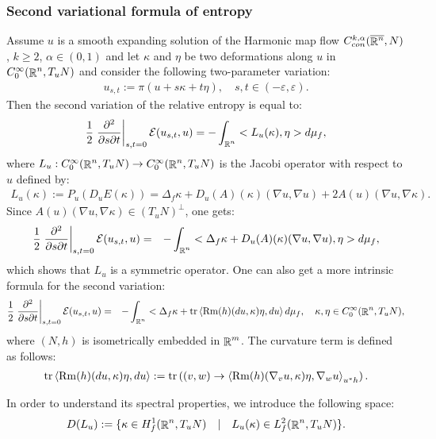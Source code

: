 \documentclass[a4paper,11pt,reqno]{amsart}
\def\Rm{\mathop{\rm Rm}\nolimits}
\def\tr{\mathop{\rm tr}\nolimits}
\def\Rm{\mathop{\rm Rm}\nolimits}
\def\tr{\mathop{\rm tr}\nolimits}
\def\R{\mathop{\rm \mathbb{R}}\nolimits}
\newcommand{\Ent}{\mathcal{E}}
\begin{document}
\subsubsection{Second variational formula of entropy}

Assume $u$ is a smooth expanding solution of the Harmonic map flow $C_{con}^{k,\alpha}(\overline{\R^n},N)$, $k\geq 2$, $\alpha\in(0,1)$ and let $\kappa$ and $\eta$ be two deformations along $u$ in $C^{\infty}_0(\R^n,T_uN)$  and consider the following two-parameter variation:
\begin{eqnarray*}
u_{s,t}:=\pi(u+s\kappa+t\eta),\quad s,t\in(-\varepsilon,\varepsilon).
\end{eqnarray*}
Then the second variation of the relative entropy is equal to:
\begin{eqnarray*}
\frac{1}{2}\left.\frac{\partial^2}{\partial s\partial t}\right|_{s,t=0}\Ent(u_{s,t},u)=-\int_{\R^n}<L_u(\kappa),\eta>d\mu_f,
\end{eqnarray*}
where $L_u:C^{\infty}_0(\R^n,T_uN)\rightarrow C^{\infty}_0(\R^n,T_uN)$ is the Jacobi operator with respect to $u$ defined by:
\begin{eqnarray*}
L_u(\kappa):=P_u(D_uE(\kappa))=\Delta_f\kappa+D_u(A)(\kappa)(\nabla u,\nabla u)+2A(u)(\nabla u,\nabla \kappa).
\end{eqnarray*}
Since $A(u)(\nabla u,\nabla \kappa)\in (T_uN)^{\perp}$, one gets:
\begin{eqnarray*}
\frac{1}{2}\left.\frac{\partial^2}{\partial s\partial t}\right|_{s,t=0}\Ent(u_{s,t},u)&=&-\int_{\R^n}<\Delta_f\kappa+D_u(A)(\kappa)(\nabla u,\nabla u),\eta>d\mu_f,
\end{eqnarray*}
which shows that $L_u$ is a symmetric operator. One can also get a more intrinsic formula for the second variation:
\begin{eqnarray*}
\frac{1}{2}\left.\frac{\partial^2}{\partial s\partial t}\right|_{s,t=0}\Ent(u_{s,t},u)&=&-\int_{\R^n}<\Delta_f\kappa+\tr\left<\Rm(h)(du,\kappa)\eta,du\right>d\mu_f,\quad \kappa,\eta\in C^{\infty}_0(\R^n,T_uN),
\end{eqnarray*}
where $(N,h)$ is isometrically embedded in $\R^m$. The curvature term is defined as follows:
\begin{eqnarray*}
\tr\left<\Rm(h)(du,\kappa)\eta,du\right>:=\tr\left((v,w)\rightarrow\left<\Rm(h)(\nabla_vu,\kappa)\eta,\nabla_wu\right>_{u^*h}\right).
\end{eqnarray*}


In order to understand its spectral properties, we introduce the following space:
\begin{eqnarray*}
D(L_u):=\{\kappa\in H^1_f(\R^n,T_uN)\quad|\quad L_u(\kappa)\in L^2_f(\R^n,T_uN)\}.
\end{eqnarray*}
\end{document}
